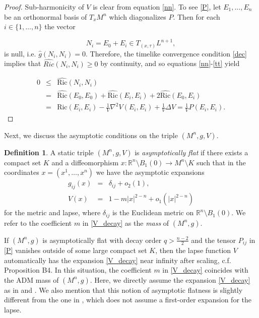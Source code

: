 \documentclass[12pt]{amsart}
\theoremstyle{definition}
\newtheorem{definition}[theorem]{Definition}
\numberwithin{equation}{section}
\begin{document}
\begin{proof}
Sub-harmonicity of $V$ is clear from equation \eqref{nn}. To see \eqref{P}, let $E_{1},\dots,E_{n}$ be an orthonormal basis of $T_{x} M^{n}$ which diagonalizes $P$. Then for each $i \in \{ 1,\dots,n\}$ the vector 

\begin{equation*}
    N_{i} = E_{0} + E_{i} \in T_{(x,\tau)} L^{n+1},
\end{equation*}
is null, i.e. $\widehat{g}(N_{i},N_{i})=0$. Therefore, the timelike convergence condition \eqref{dec} implies that $\widehat{Ric}(N_{i},N_{i}) \geq 0$ by continuity, and so equations \eqref{nn}-\eqref{tt} yield

\begin{eqnarray*}
    0 &\leq&  \widehat{\text{Ric}} (N_{i}, N_{i})\\
    &=& \widehat{\text{Ric}} (E_{0},E_{0}) + \widehat{\text{Ric}} (E_{i},E_{i}) + 2 \widehat{\text{Ric}} (E_{0},E_{i}) \\
    &=& \text{Ric}(E_{i},E_{i}) - \frac{1}{V} \nabla^{2} V(E_{i},E_{i}) + \frac{1}{V} \Delta V= \frac{1}{V}P(E_{i},E_{i}).
\end{eqnarray*}
\end{proof}
Next, we discuss the asymptotic conditions on the triple $(M^{n},g,V)$.
\begin{definition} \label{af}
A static triple $(M^{n},g,V)$ is \textit{asymptotically flat} if there exists a compact set $K$ and a diffeomorphism $x: \mathbb{R}^{n} \setminus B_{1}(0) \rightarrow M^{n} \setminus K$ such that in the coordinates $x=(x^{1},\dots,x^{n})$ we have the asymptotic expansions
\begin{eqnarray}
    g_{ij}(x) &=& \delta_{ij} + o_{2}(1), \label{g_decay} \\
    V(x) &=& 1 - m |x|^{2-n} + o_{1}(|x|^{2-n}) \label{V_decay}
\end{eqnarray}
for the metric and lapse, where $\delta_{ij}$ is the Euclidean metric on $\mathbb{R}^{n} \setminus B_{1}(0)$. We refer to the coefficient $m$ in \eqref{V_decay} as the \textit{mass} of $(M^{n},g)$.
\end{definition}
If $(M^{n},g)$ is asymptotically flat with decay order $q > \frac{n-2}{2}$ and the tensor $P_{ij}$ in \eqref{P} vanishes outside of some large compact set $K$, then the lapse function $V$ automatically has the expansion \eqref{V_decay} near infinity after scaling, c.f. \cite{HMM17} Proposition B4. In this situation, the coefficient $m$ in \eqref{V_decay} coincides with the ADM mass of $(M^{n},g)$. Here, we directly assume the expansion \eqref{V_decay} as in \cite{KL18} and \cite{YL15}. We also mention that this notion of asymptotic flatness is slightly different from the one in \cite{HW24a}, which does not assume a first-order expansion for the lapse. 
\end{document}
